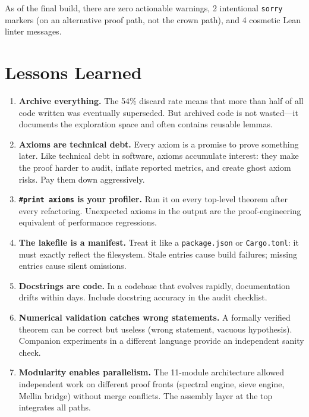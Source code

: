 \documentclass[11pt,a4paper]{article}
\theoremstyle{definition}
\newcommand{\lean}[1]{\texttt{#1}}
\begin{document}
As of the final build, there are zero actionable warnings, 2
intentional \lean{sorry} markers (on an alternative proof path,
not the crown path), and 4 cosmetic Lean linter messages.

\section{Lessons Learned}
\label{sec:lessons}

\begin{enumerate}
  \item \textbf{Archive everything.} The 54\% discard rate means that
    more than half of all code written was eventually superseded. But
    archived code is not wasted---it documents the exploration space
    and often contains reusable lemmas.

  \item \textbf{Axioms are technical debt.} Every axiom is a promise
    to prove something later. Like technical debt in software, axioms
    accumulate interest: they make the proof harder to audit, inflate
    reported metrics, and create ghost axiom risks. Pay them down
    aggressively.

  \item \textbf{\lean{\#print axioms} is your profiler.} Run it on
    every top-level theorem after every refactoring. Unexpected
    axioms in the output are the proof-engineering equivalent of
    performance regressions.

  \item \textbf{The lakefile is a manifest.} Treat it like a
    \texttt{package.json} or \texttt{Cargo.toml}: it must exactly
    reflect the filesystem. Stale entries cause build failures;
    missing entries cause silent omissions.

  \item \textbf{Docstrings are code.} In a codebase that evolves
    rapidly, documentation drifts within days. Include docstring
    accuracy in the audit checklist.

  \item \textbf{Numerical validation catches wrong statements.}
    A formally verified theorem can be correct but useless (wrong
    statement, vacuous hypothesis). Companion experiments in a
    different language provide an independent sanity check.

  \item \textbf{Modularity enables parallelism.} The 11-module
    architecture allowed independent work on different proof fronts
    (spectral engine, sieve engine, Mellin bridge) without merge
    conflicts. The assembly layer at the top integrates all paths.


\end{enumerate}
\end{document}
